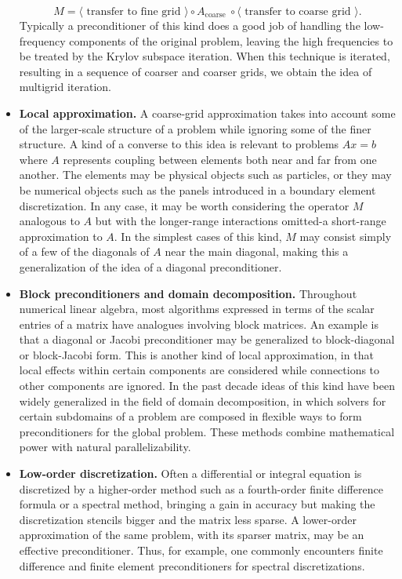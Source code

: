 \begin{itemize}
    $$
    M=\langle\text { transfer to fine grid }\rangle \circ A_{\text {coarse }} \circ\langle\text { transfer to coarse grid }\rangle .
    $$
    Typically a preconditioner of this kind does a good job of handling the low-frequency components of the original problem, leaving the high frequencies to be treated by the Krylov subspace iteration. When this technique is iterated, resulting in a sequence of coarser and coarser grids, we obtain the idea of multigrid iteration.
    \item \textbf{Local approximation.} A coarse-grid approximation takes into account some of the larger-scale structure of a problem while ignoring some of the finer structure. A kind of a converse to this idea is relevant to problems $A x=b$ where $A$ represents coupling between elements both near and far from one another. The elements may be physical objects such as particles, or they may be numerical objects such as the panels introduced in a boundary element discretization. In any case, it may be worth considering the operator $M$ analogous to $A$ but with the longer-range interactions omitted-a short-range approximation to $A$. In the simplest cases of this kind, $M$ may consist simply of a few of the diagonals of $A$ near the main diagonal, making this a generalization of the idea of a diagonal preconditioner.
    \item \textbf{Block preconditioners and domain decomposition.} Throughout numerical linear algebra, most algorithms expressed in terms of the scalar entries of a matrix have analogues involving block matrices. An example is that a diagonal or Jacobi preconditioner may be generalized to block-diagonal or block-Jacobi form. This is another kind of local approximation, in that local effects within certain components are considered while connections to other components are ignored. In the past decade ideas of this kind have been widely generalized in the field of domain decomposition, in which solvers for certain subdomains of a problem are composed in flexible ways to form preconditioners for the global problem. These methods combine mathematical power with natural parallelizability.
    \item \textbf{Low-order discretization. }Often a differential or integral equation is discretized by a higher-order method such as a fourth-order finite difference formula or a spectral method, bringing a gain in accuracy but making the discretization stencils bigger and the matrix less sparse. A lower-order approximation of the same problem, with its sparser matrix, may be an effective preconditioner. Thus, for example, one commonly encounters finite difference and finite element preconditioners for spectral discretizations.


\end{itemize}
